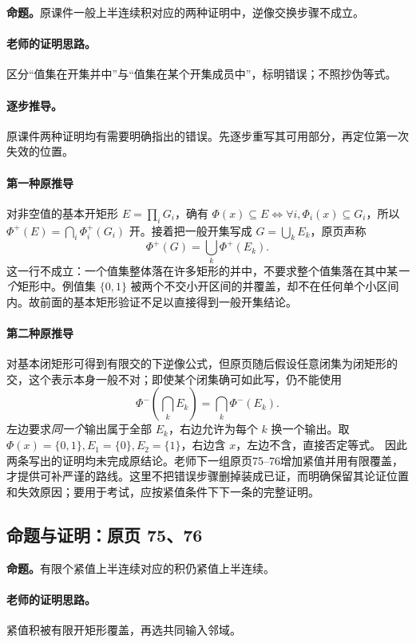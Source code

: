 \documentclass[11pt,a4paper]{article}
\theoremstyle{definition}\newtheorem{definition}{定义}\newtheorem{example}{例}
\begin{document}
\textbf{命题。}原课件一般上半连续积对应的两种证明中，逆像交换步骤不成立。

\paragraph{老师的证明思路。}区分“值集在开集并中”与“值集在某个开集成员中”，标明错误；不照抄伪等式。

\paragraph{逐步推导。}
原课件两种证明均有需要明确指出的错误。先逐步重写其可用部分，再定位第一次失效的位置。
\paragraph{第一种原推导}对非空值的基本开矩形 $E=\prod_iG_i$，确有 $\Phi(x)\subseteq E\iff\forall i,\Phi_i(x)\subseteq G_i$，所以 $\Phi^+(E)=\bigcap_i\Phi_i^+(G_i)$ 开。接着把一般开集写成 $G=\bigcup_kE_k$，原页声称
\[\Phi^+(G)=\bigcup_k\Phi^+(E_k).\]
这一行不成立：一个值集整体落在许多矩形的并中，不要求整个值集落在其中某\emph{一个}矩形中。例值集 $\{0,1\}$ 被两个不交小开区间的并覆盖，却不在任何单个小区间内。故前面的基本矩形验证不足以直接得到一般开集结论。
\paragraph{第二种原推导}对基本闭矩形可得到有限交的下逆像公式，但原页随后假设任意闭集为闭矩形的交，这个表示本身一般不对；即使某个闭集确可如此写，仍不能使用
\[\Phi^-(\bigcap_kE_k)=\bigcap_k\Phi^-(E_k).\]
左边要求\emph{同一个}输出属于全部 $E_k$，右边允许为每个 $k$ 换一个输出。取 $\Phi(x)=\{0,1\},E_1=\{0\},E_2=\{1\}$，右边含 $x$，左边不含，直接否定等式。
因此两条写出的证明均未完成原结论。老师下一组原页75--76增加紧值并用有限覆盖，才提供可补严谨的路线。这里不把错误步骤删掉装成已证，而明确保留其论证位置和失效原因；要用于考试，应按紧值条件下下一条的完整证明。


\subsection{命题与证明：原页 75、76}

\textbf{命题。}有限个紧值上半连续对应的积仍紧值上半连续。

\paragraph{老师的证明思路。}紧值积被有限开矩形覆盖，再选共同输入邻域。
\end{document}
